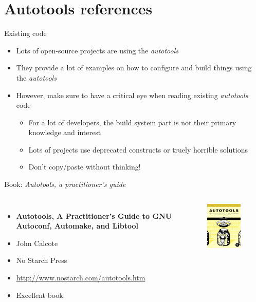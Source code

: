 \section{Autotools references}

\begin{frame}{Existing code}
  \begin{itemize}
  \item Lots of open-source projects are using the {\em autotools}
  \item They provide a lot of examples on how to configure and build
    things using the {\em autotools}
  \item However, make sure to have a critical eye when reading
    existing {\em autotools} code
    \begin{itemize}
    \item For a lot of developers, the build system part is not their
      primary knowledge and interest
    \item Lots of projects use deprecated constructs or truely
      horrible solutions
    \item Don't copy/paste without thinking!
    \end{itemize}
  \end{itemize}
\end{frame}

\begin{frame}{Book: {\em Autotools, a practitioner's guide}}
  \begin{columns}
    \begin{itemize}
    \item {\bf Autotools, A Practitioner's Guide to GNU Autoconf, Automake, and Libtool}
    \item John Calcote
    \item No Starch Press
    \item \url{http://www.nostarch.com/autotools.htm}
    \item Excellent book.
    \end{itemize}
    \includegraphics[width=0.6\textwidth]{slides/autotools-references/autotools-book.png}
  \end{columns}
\end{frame}

